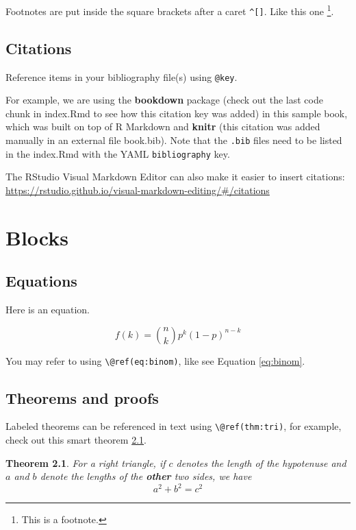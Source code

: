 \documentclass[
]{book}
\newtheorem{theorem}{Theorem}[chapter]
\theoremstyle{definition}
\theoremstyle{definition}
\theoremstyle{definition}
\theoremstyle{definition}
\theoremstyle{remark}
\begin{document}
Footnotes are put inside the square brackets after a caret \texttt{\^{}{[}{]}}. Like this one \footnote{This is a footnote.}.

\section{Citations}\label{citations}

Reference items in your bibliography file(s) using \texttt{@key}.

For example, we are using the \textbf{bookdown} package \citep{R-bookdown} (check out the last code chunk in index.Rmd to see how this citation key was added) in this sample book, which was built on top of R Markdown and \textbf{knitr} \citep{xie2015} (this citation was added manually in an external file book.bib).
Note that the \texttt{.bib} files need to be listed in the index.Rmd with the YAML \texttt{bibliography} key.

The RStudio Visual Markdown Editor can also make it easier to insert citations: \url{https://rstudio.github.io/visual-markdown-editing/\#/citations}

\chapter{Blocks}\label{blocks}

\section{Equations}\label{equations}

Here is an equation.

\begin{equation} 
  f\left(k\right) = \binom{n}{k} p^k\left(1-p\right)^{n-k}
  \label{eq:binom}
\end{equation}

You may refer to using \texttt{\textbackslash{}@ref(eq:binom)}, like see Equation \eqref{eq:binom}.

\section{Theorems and proofs}\label{theorems-and-proofs}

Labeled theorems can be referenced in text using \texttt{\textbackslash{}@ref(thm:tri)}, for example, check out this smart theorem \ref{thm:tri}.

\begin{theorem}
\protect\hypertarget{thm:tri}{}\label{thm:tri}For a right triangle, if \(c\) denotes the \emph{length} of the hypotenuse
and \(a\) and \(b\) denote the lengths of the \textbf{other} two sides, we have
\[a^2 + b^2 = c^2\]
\end{theorem}
\end{document}
